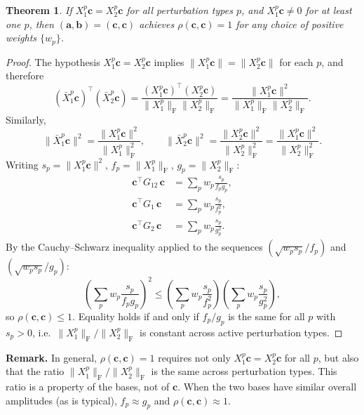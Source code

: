 \documentclass[a4paper,11pt]{article}
\newcommand{\va}{\bm{a}}
\newcommand{\vb}{\bm{b}}
\newcommand{\vc}{\bm{c}}
\newcommand{\Xb}[2]{X_{#1}^{#2}}
\newcommand{\Xn}[2]{\bar{X}_{#1}^{#2}}
\newcommand{\Gb}[1]{G_{#1}}
\newcommand{\frob}[1]{\lVert #1 \rVert_{\mathrm{F}}}
\theoremstyle{plain}
\newtheorem{theorem}{Theorem}
\begin{document}
\begin{theorem}
\label{thm:weight-indep}
If\/ $\Xb{1}{p} \vc = \Xb{2}{p} \vc$ for all perturbation types $p$, and $\Xb{1}{p}\vc \neq 0$ for at least one $p$, then $(\va, \vb) = (\vc, \vc)$ achieves $\rho(\vc, \vc) = 1$ for any choice of positive weights $\{w_p\}$.
\end{theorem}

\begin{proof}
The hypothesis $\Xb{1}{p}\vc = \Xb{2}{p}\vc$ implies $\lVert\Xb{1}{p}\vc\rVert = \lVert\Xb{2}{p}\vc\rVert$ for each $p$, and therefore
\begin{equation}
    (\Xn{1}{p}\vc)^\top (\Xn{2}{p}\vc) = \frac{(\Xb{1}{p}\vc)^\top(\Xb{2}{p}\vc)}{\frob{\Xb{1}{p}}\frob{\Xb{2}{p}}} = \frac{\lVert\Xb{1}{p}\vc\rVert^2}{\frob{\Xb{1}{p}}\frob{\Xb{2}{p}}}.
\end{equation}
Similarly,
\begin{equation}
    \lVert\Xn{1}{p}\vc\rVert^2 = \frac{\lVert\Xb{1}{p}\vc\rVert^2}{\frob{\Xb{1}{p}}^2}, \qquad
    \lVert\Xn{2}{p}\vc\rVert^2 = \frac{\lVert\Xb{2}{p}\vc\rVert^2}{\frob{\Xb{2}{p}}^2} = \frac{\lVert\Xb{1}{p}\vc\rVert^2}{\frob{\Xb{2}{p}}^2}.
\end{equation}
Writing $s_p = \lVert\Xb{1}{p}\vc\rVert^2$, $f_p = \frob{\Xb{1}{p}}$, $g_p = \frob{\Xb{2}{p}}$:
\begin{align}
    \vc^\top \Gb{12} \, \vc &= \sum_p w_p \frac{s_p}{f_p g_p}, \\
    \vc^\top \Gb{1} \, \vc &= \sum_p w_p \frac{s_p}{f_p^2}, \\
    \vc^\top \Gb{2} \, \vc &= \sum_p w_p \frac{s_p}{g_p^2}.
\end{align}
By the Cauchy--Schwarz inequality applied to the sequences $(\sqrt{w_p s_p}/f_p)$ and $(\sqrt{w_p s_p}/g_p)$:
\begin{equation}
    \left(\sum_p w_p \frac{s_p}{f_p g_p}\right)^2 \leq \left(\sum_p w_p \frac{s_p}{f_p^2}\right)\left(\sum_p w_p \frac{s_p}{g_p^2}\right),
\end{equation}
so $\rho(\vc,\vc) \leq 1$.
Equality holds if and only if $f_p / g_p$ is the same for all $p$ with $s_p > 0$, i.e.\ $\frob{\Xb{1}{p}}/\frob{\Xb{2}{p}}$ is constant across active perturbation types.
\end{proof}

\noindent\textbf{Remark.}
In general, $\rho(\vc,\vc) = 1$ requires not only $\Xb{1}{p}\vc = \Xb{2}{p}\vc$ for all $p$, but also that the ratio $\frob{\Xb{1}{p}}/\frob{\Xb{2}{p}}$ is the same across perturbation types.
This ratio is a property of the bases, not of $\vc$.
When the two bases have similar overall amplitudes (as is typical), $f_p \approx g_p$ and $\rho(\vc,\vc) \approx 1$.
\end{document}
